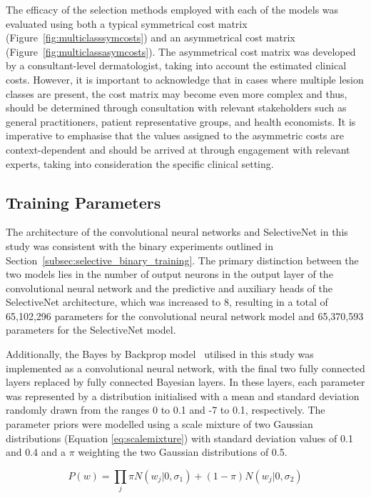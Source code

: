 The efficacy of the selection methods employed with each of the models was evaluated using both a typical symmetrical cost matrix (Figure~\ref{fig:multiclasssymcosts}) and an asymmetrical cost matrix (Figure~\ref{fig:multiclassasymcosts}). The asymmetrical cost matrix was developed by a consultant-level dermatologist, taking into account the estimated clinical costs. However, it is important to acknowledge that in cases where multiple lesion classes are present, the cost matrix may become even more complex and thus, should be determined through consultation with relevant stakeholders such as general practitioners, patient representative groups, and health economists. It is imperative to emphasise that the values assigned to the asymmetric costs are context-dependent and should be arrived at through engagement with relevant experts, taking into consideration the specific clinical setting.

\subsection{Training Parameters}
The architecture of the convolutional neural networks and SelectiveNet in this study was consistent with the binary experiments outlined in Section~\ref{subsec:selective_binary_training}. The primary distinction between the two models lies in the number of output neurons in the output layer of the convolutional neural network and the predictive and auxiliary heads of the SelectiveNet architecture, which was increased to 8, resulting in a total of 65,102,296 parameters for the convolutional neural network model and 65,370,593 parameters for the SelectiveNet model.

Additionally, the Bayes by Backprop model~\citep{Blundell2015Weight} utilised in this study was implemented as a convolutional neural network, with the final two fully connected layers replaced by fully connected Bayesian layers. In these layers, each parameter was represented by a distribution initialised with a mean and standard deviation randomly drawn from the ranges 0 to 0.1 and -7 to 0.1, respectively. The parameter priors were modelled using a scale mixture of two Gaussian distributions (Equation \ref{eq:scalemixture}) with standard deviation values of 0.1 and 0.4 and a $\pi$ weighting the two Gaussian distributions of 0.5.

\begin{equation}
	P(w) = \prod_j\pi N(w_j|0, \sigma_1) + (1-\pi) N(w_j|0, \sigma_2)
	\label{eq:scalemixture}
\end{equation}

